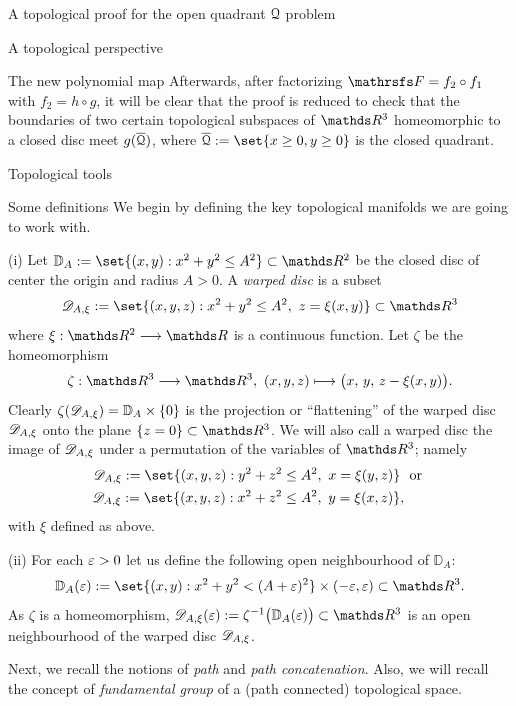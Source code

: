 \documentclass[11pt, a4paper, english, twoside, notitlepage, openright]{report}
\begin{document}
\begin{chapter}{A topological proof for the open quadrant $\mathcal{Q}$ problem}
\begin{section}{A topological perspective}
\begin{subsection}{The new polynomial map}
Afterwards, after factorizing $\FFF=f_2\circ f_1$ with $f_2=h\circ g$, it will be clear that the proof is reduced to check that the boundaries of two certain topological subspaces of $\R^3$ homeomorphic to a closed disc meet $g(\overline{\mathcal{Q}})$, where $\overline{\Qu}:=\set{x\ge 0,y\ge 0}$ is the closed quadrant.
\end{subsection}
\end{section}
\begin{section}{Topological tools}\label{TTT}
\begin{subsection}{Some definitions}\label{topDefs}
We begin by defining the key topological manifolds we are going to work with.
\begin{definitions}
(i) Let ${\mathbb D}_A:=\set{(x,y):x^2+y^2\le A^2}\subset\R^2$ be the closed disc of center the origin and radius $A>0$. A \textit{warped disc} is a subset 
$$
\D_{A,\xi}:=\set{(x,y,z):x^2+y^2\le A^2,\ z=\xi(x,y)}\subset\R^3$$
where $\xi:\R^2\longrightarrow\R$ is a continuous function. Let $\zeta$ be the homeomorphism
$$
\zeta:\R^3\longrightarrow\R^3,\ (x,y,z)\longmapsto\big(x,\, y,\, z-\xi(x,y)\big).
$$
Clearly $\zeta(\mathscr{D}_{A,\xi})={\mathbb D}_A\times\{0\}$ is the projection or ``flattening'' of the warped disc $\mathscr{D}_{A,\xi}$ onto the plane $\{z=0\}\subset\R^3$. We will also call a warped disc the image of $\mathscr{D}_{A,\xi}$ under a permutation of the variables of $\R^3$; namely
\begin{equation*}
\begin{aligned}
\D_{A,\xi}:=\set{(x,y,z): y^2+z^2\le A^2,\ x=\xi(y,z)}& \ \text{ or } \\
\D_{A,\xi}:=\set{(x,y,z): x^2+z^2\le A^2,\ y=\xi(x,z)}&,
\end{aligned}
\end{equation*}
with $\xi$ defined as above.

\vspace{1mm}

(ii) For each $\varepsilon>0$ let us define the following  open neighbourhood of ${\mathbb D}_A$: 
$$
{\mathbb D}_A(\eps):=\set{(x,y):x^2+y^2<(A+\eps)^2}\times(-\eps,\eps)\subset\R^3.
$$ 
As $\zeta$ is a homeomorphism, $\D_{A,\xi}(\eps):=\zeta^{-1}\big({\mathbb D}_A(\eps)\big)\subset\R^3$ is an open neighbourhood of the warped disc $\mathscr{D}_{A,\xi}$. 
\end{definitions}

Next, we recall the notions of \emph{path} and \emph{path concatenation}. Also, we will recall the concept of  \emph{fundamental group} of a (path connected) topological space.


\end{subsection}
\end{section}
\end{chapter}
\end{document}
